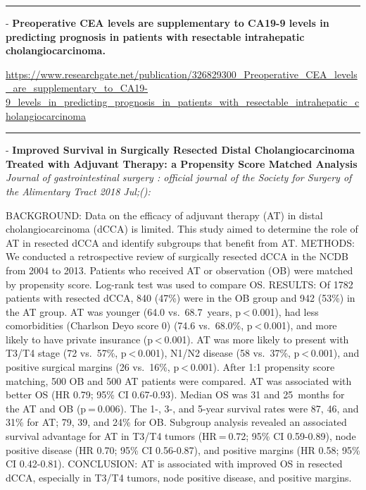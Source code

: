 \documentclass[]{article}
\begin{document}
\begin{center}\rule{0.5\linewidth}{\linethickness}\end{center}

 - \textbf{Preoperative CEA levels are supplementary to CA19-9 levels in
predicting prognosis in patients with resectable intrahepatic
cholangiocarcinoma.}

\url{https://www.researchgate.net/publication/326829300_Preoperative_CEA_levels_are_supplementary_to_CA19-9_levels_in_predicting_prognosis_in_patients_with_resectable_intrahepatic_cholangiocarcinoma}

\begin{center}\rule{0.5\linewidth}{\linethickness}\end{center}

 - \textbf{Improved Survival in Surgically Resected Distal
Cholangiocarcinoma Treated with Adjuvant Therapy: a Propensity Score
Matched Analysis} \emph{Journal of gastrointestinal surgery : official
journal of the Society for Surgery of the Alimentary Tract 2018 Jul;():}

BACKGROUND: Data on the efficacy of adjuvant therapy (AT) in distal
cholangiocarcinoma (dCCA) is limited. This study aimed to determine the
role of AT in resected dCCA and identify subgroups that benefit from AT.
METHODS: We conducted a retrospective review of surgically resected dCCA
in the NCDB from 2004 to 2013. Patients who received AT or observation
(OB) were matched by propensity score. Log-rank test was used to compare
OS. RESULTS: Of 1782 patients with resected dCCA, 840 (47\%) were in the
OB group and 942 (53\%) in the AT group. AT was younger (64.0
vs.~68.7~years, p \textless{} 0.001), had less comorbidities (Charlson
Deyo score 0) (74.6 vs.~68.0\%, p \textless{} 0.001), and more likely to
have private insurance (p \textless{} 0.001). AT was more likely to
present with T3/T4 stage (72 vs.~57\%, p \textless{} 0.001), N1/N2
disease (58 vs.~37\%, p \textless{} 0.001), and positive surgical
margins (26 vs.~16\%, p \textless{} 0.001). After 1:1 propensity score
matching, 500 OB and 500 AT patients were compared. AT was associated
with better OS (HR 0.79; 95\% CI 0.67-0.93). Median OS was 31 and
25~months for the AT and OB (p = 0.006). The 1-, 3-, and 5-year survival
rates were 87, 46, and 31\% for AT; 79, 39, and 24\% for OB. Subgroup
analysis revealed an associated survival advantage for AT in T3/T4
tumors (HR = 0.72; 95\% CI 0.59-0.89), node positive disease (HR 0.70;
95\% CI 0.56-0.87), and positive margins (HR 0.58; 95\% CI 0.42-0.81).
CONCLUSION: AT is associated with improved OS in resected dCCA,
especially in T3/T4 tumors, node positive disease, and positive margins.
\end{document}
